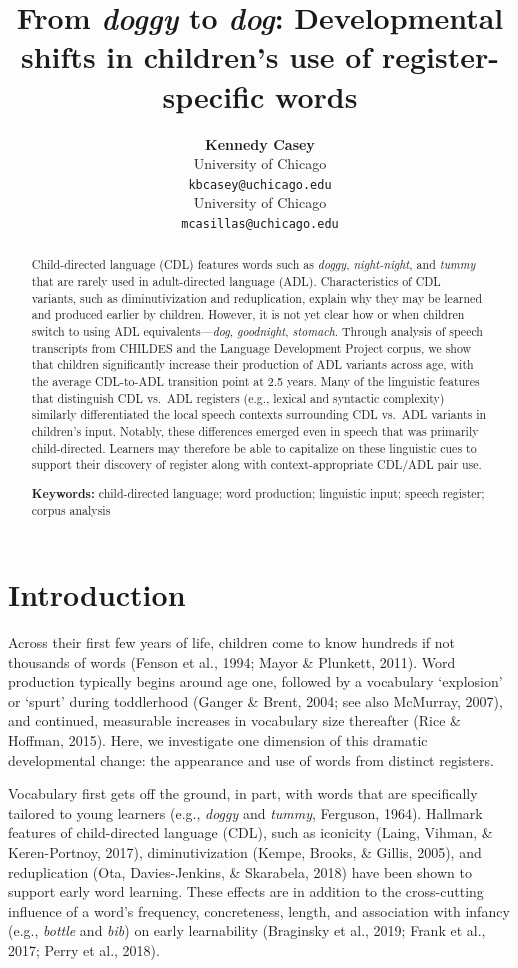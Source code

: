 \documentclass[10pt, letterpaper]{article}
\title{From \emph{doggy} to \emph{dog}: Developmental shifts in
children's use of register-specific words}
\author{{\large \bf Kennedy Casey} \\ University of Chicago \\ \texttt{kbcasey@uchicago.edu} \And {\large \bf Marisa Casillas} \\ University of Chicago \\ \texttt{mcasillas@uchicago.edu}}
\begin{document}
\maketitle

\begin{abstract}
Child-directed language (CDL) features words such as \emph{doggy},
\emph{night-night}, and \emph{tummy} that are rarely used in
adult-directed language (ADL). Characteristics of CDL variants, such as
diminutivization and reduplication, explain why they may be learned and
produced earlier by children. However, it is not yet clear how or when
children switch to using ADL equivalents---\emph{dog}, \emph{goodnight},
\emph{stomach}. Through analysis of speech transcripts from CHILDES and
the Language Development Project corpus, we show that children
significantly increase their production of ADL variants across age, with
the average CDL-to-ADL transition point at 2.5 years. Many of the
linguistic features that distinguish CDL vs.~ADL registers (e.g.,
lexical and syntactic complexity) similarly differentiated the local
speech contexts surrounding CDL vs.~ADL variants in children's input.
Notably, these differences emerged even in speech that was primarily
child-directed. Learners may therefore be able to capitalize on these
linguistic cues to support their discovery of register along with
context-appropriate CDL/ADL pair use.

\textbf{Keywords:}
child-directed language; word production; linguistic input; speech
register; corpus analysis
\end{abstract}

\hypertarget{introduction}{%
\section{Introduction}\label{introduction}}

Across their first few years of life, children come to know hundreds if
not thousands of words (Fenson et al., 1994; Mayor \& Plunkett, 2011).
Word production typically begins around age one, followed by a
vocabulary `explosion' or `spurt' during toddlerhood (Ganger \& Brent,
2004; see also McMurray, 2007), and continued, measurable increases in
vocabulary size thereafter (Rice \& Hoffman, 2015). Here, we investigate
one dimension of this dramatic developmental change: the appearance and
use of words from distinct registers.

Vocabulary first gets off the ground, in part, with words that are
specifically tailored to young learners (e.g., \emph{doggy} and
\emph{tummy}, Ferguson, 1964). Hallmark features of child-directed
language (CDL), such as iconicity (Laing, Vihman, \& Keren-Portnoy,
2017), diminutivization (Kempe, Brooks, \& Gillis, 2005), and
reduplication (Ota, Davies-Jenkins, \& Skarabela, 2018) have been shown
to support early word learning. These effects are in addition to the
cross-cutting influence of a word's frequency, concreteness, length, and
association with infancy (e.g., \emph{bottle} and \emph{bib}) on early
learnability (Braginsky et al., 2019; Frank et al., 2017; Perry et al.,
2018).
\end{document}
